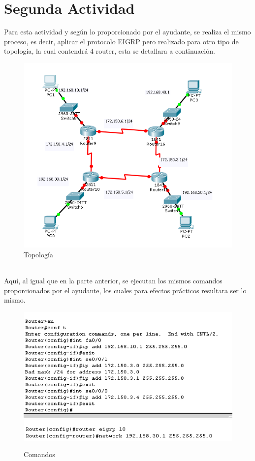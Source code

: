\documentclass[spanish]{udpreport}
\begin{document}
\section{Segunda Actividad}
Para esta actividad y según lo proporcionado por el ayudante, se realiza el mismo proceso, es decir, aplicar el protocolo EIGRP pero realizado para otro tipo de topología, la cual contendrá 4 router, esta se detallara a continuación.
\begin{figure}[h]
    \centering
    \includegraphics[scale=0.4]{images/co.png}
    \caption{Topología}
    \label{fig:my_label}
\end{figure}
\\ Aquí, al igual que en la parte anterior, se ejecutan los mismos comandos proporcionados por el ayudante, los cuales para efectos prácticos resultara ser lo mismo. 
\\
\begin{figure}[h]
    \centering
    \includegraphics[scale=0.4]{images/22.png}
    \includegraphics[scale=0.5]{images/112.png}
    \caption{Comandos}
    \label{fig:my_label}
\end{figure}
\end{document}

